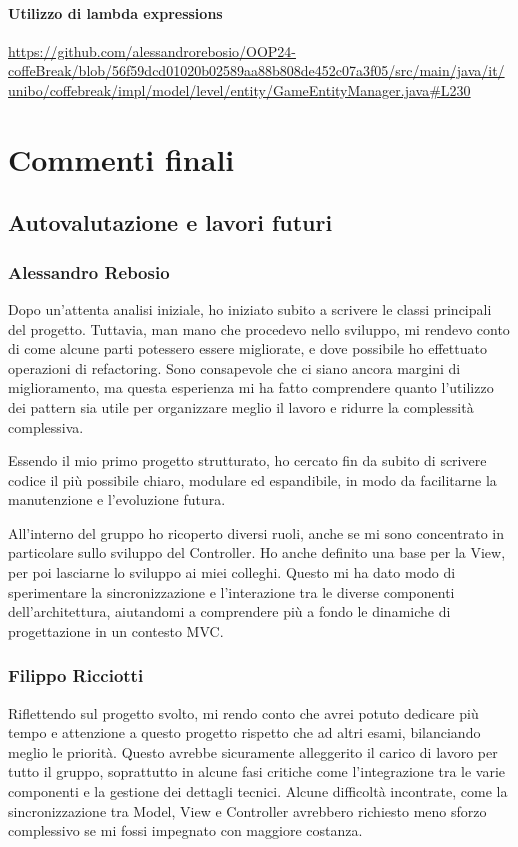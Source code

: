 \documentclass[a4paper,12pt]{report}
\begin{document}
\subsubsection{Utilizzo di lambda expressions}
\begin{sloppypar}
	\raggedright
	\url{https://github.com/alessandrorebosio/OOP24-coffeBreak/blob/56f59dcd01020b02589aa88b808de452c07a3f05/src/main/java/it/unibo/coffebreak/impl/model/level/entity/GameEntityManager.java#L230}
\end{sloppypar}
\chapter{Commenti finali}
\section{Autovalutazione e lavori futuri}
\subsection{Alessandro Rebosio}
Dopo un'attenta analisi iniziale, ho iniziato subito a scrivere le classi principali del progetto. Tuttavia, man mano che procedevo nello sviluppo, mi rendevo conto di come alcune
parti potessero essere migliorate, e dove possibile ho effettuato operazioni di refactoring. Sono consapevole che ci siano ancora margini di miglioramento, ma questa esperienza mi ha fatto
comprendere quanto l'utilizzo dei pattern sia utile per organizzare meglio il lavoro e ridurre la complessità complessiva.

Essendo il mio primo progetto strutturato, ho cercato fin da subito di scrivere codice il più possibile chiaro, modulare ed espandibile, in modo da facilitarne la manutenzione e l'evoluzione futura.

All'interno del gruppo ho ricoperto diversi ruoli, anche se mi sono concentrato in particolare sullo sviluppo del Controller. Ho anche definito una base per la View, per poi lasciarne lo
sviluppo ai miei colleghi. Questo mi ha dato modo di sperimentare la sincronizzazione e l'interazione tra le diverse componenti dell'architettura, aiutandomi a comprendere più a
fondo le dinamiche di progettazione in un contesto MVC.

\subsection{Filippo Ricciotti}
Riflettendo sul progetto svolto, mi rendo conto che avrei potuto dedicare più tempo e attenzione a questo progetto rispetto che ad altri esami, bilanciando meglio le priorità. Questo avrebbe sicuramente alleggerito il carico di lavoro per tutto il gruppo, soprattutto in alcune fasi critiche come l’integrazione tra le varie componenti e la gestione dei dettagli tecnici. Alcune difficoltà incontrate, come la sincronizzazione tra Model, View e Controller avrebbero richiesto meno sforzo complessivo se mi fossi impegnato con maggiore costanza.
\end{document}
